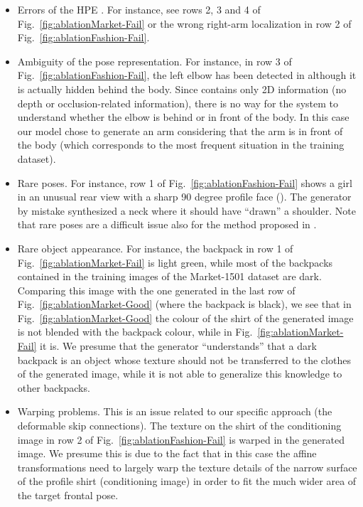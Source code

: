 \documentclass[10pt,twocolumn,letterpaper]{article}
\begin{document}
\begin{itemize}
\item 
Errors of the HPE \cite{Cao}. For instance, see rows 2, 3 and 4 of  Fig.~\ref{fig:ablationMarket-Fail} or the wrong right-arm localization in row 2 of Fig.~\ref{fig:ablationFashion-Fail}.
\item
Ambiguity of the pose representation. 
For instance,
in  row 3 of Fig.~\ref{fig:ablationFashion-Fail},  the left elbow has been detected in  although it is actually hidden behind the body. Since  contains only 2D information (no depth or occlusion-related information), there is no way for the system to understand whether the elbow is behind or in front of the body.  In this case our model chose to generate an arm considering that the arm is in front of the body (which corresponds to the most frequent situation in the training dataset). 
 \item 
 Rare poses. For instance, row 1 of Fig.~\ref{fig:ablationFashion-Fail} shows a girl in an unusual  rear view with a sharp 90 degree profile face (). The generator by mistake synthesized a neck where it should have ``drawn'' a shoulder. Note that rare poses are a difficult issue also for the method proposed in \cite{ma2017pose}.
 \item 
 Rare object appearance. For instance, the backpack in row 1 of Fig.~\ref{fig:ablationMarket-Fail} is light green, while most of the backpacks contained in the training images of the Market-1501 dataset are dark. Comparing this image with the one generated in the last row of Fig.~\ref{fig:ablationMarket-Good} (where the backpack is black), we see that in Fig.~\ref{fig:ablationMarket-Good} the colour of the shirt of the generated image is not blended with the backpack colour, while in Fig.~\ref{fig:ablationMarket-Fail} it is.
 We presume  that the generator ``understands'' that a dark backpack is an object whose texture should not be transferred to the clothes of the generated image, while it is not able to generalize this knowledge to other backpacks. 
 \item 
 Warping problems. This is an issue related to our specific approach (the deformable skip connections). The texture on the shirt of the conditioning image in row 2 of Fig.~\ref{fig:ablationFashion-Fail} is warped in the generated image. We presume this is due to the fact that in this case the affine transformations  need to largely warp the texture details of the narrow surface of the profile shirt (conditioning image) in order to fit the much wider area of the target frontal pose.
\end{itemize}
\end{document}
